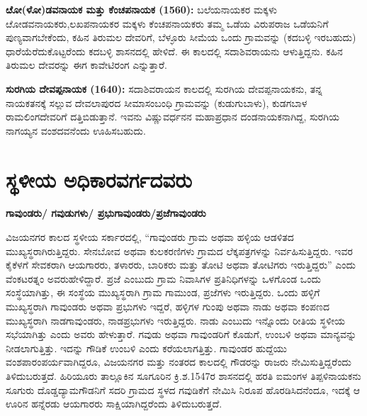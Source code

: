 \newpage

\textbf{ೞೋ(ಳೋ)ಡವನಾಯಕ ಮತ್ತು ಕೆಂಚಪನಾಯಕ (1560): }ಬಲೆಯನಾಯಕರ ಮಕ್ಕಳು ೞೋಡವನಾಯಕರು,\break ಲಖಪನಾಯಕರ ಮಕ್ಕಳು ಕೆಂಚಪನಾಯಕರು ತಮ್ಮ ಒಡೆಯ ವಿರುಪರಾಜ ಒಡೆಯನಿಗೆ ಪುಣ್ಯವಾಗಬೇಕೆಂದು, ಕಹಿನ ತಿರುಮಲ ದೇವರಿಗೆ, ಬೆಳ್ಳೂರು ಸೀಮೆಯ ಒಂದು ಗ್ರಾಮವನ್ನು (ಕದಬಳ್ಳಿ ಇರಬಹುದು) ಧಾರೆಯೆರೆದುಕೊಟ್ಟರೆಂದು ಕದಬಳ್ಳಿ ಶಾಸನದಲ್ಲಿ ಹೇಳಿದೆ. ಈ ಕಾಲದಲ್ಲಿ ಸದಾಶಿವರಾಯನು ಆಳುತ್ತಿದ್ದನು. ಕಹಿನ ತಿರುಮಲ ದೇವರನ್ನು ಈಗ ಕಾವೇಟಿರಂಗ ಎನ್ನುತ್ತಾರೆ.

\textbf{ಸುರಗಿಯ ದೇವಪ್ಪನಾಯಕ (1640):} ಸದಾಶಿವರಾಯನ ಕಾಲದಲ್ಲಿ ಸುರಗಿಯ ದೇವಪ್ಪನಾಯಕನು, ತನ್ನ ನಾಯಕ\-ತನಕ್ಕೆ ಸಲ್ಲುವ ದೇವಲಾಪುರದ ಸೀಮಾಸಂಬಂಧಿ ಗ್ರಾಮವನ್ನು (ಕುಡುಗುಬಾಳು), ಕುಡಗಬಾಳ ರಾಮಲಿಂಗದೇವರಿಗೆ ದತ್ತಿಬಿಡುತ್ತಾನೆ. ಇವನು ವಿಷ್ಣುವರ್ಧನನ ಮಹಾಪ್ರಧಾನ ದಂಡನಾಯಕನಾಗಿದ್ದ, ಸುರಗಿಯ ನಾಗಯ್ಯನ ವಂಶದವನೆಂದು ಊಹಿಸಬಹುದು.

\section{ಸ್ಥಳೀಯ ಅಧಿಕಾರವರ್ಗದವರು}

\textbf{ಗಾವುಂಡರು/ ಗವುಡುಗಳು/ ಪ್ರಭುಗಾವುಂಡರು/ಪ್ರಜೆಗಾವುಂಡರು}

ವಿಜಯನಗರ ಕಾಲದ ಸ್ಥಳೀಯ ಸರ್ಕಾರದಲ್ಲಿ, “ಗಾವುಂಡರು ಗ್ರಾಮ ಅಥವಾ ಹಳ್ಳಿಯ ಆಡಳಿತದ ಮುಖ್ಯಸ್ಥರಾಗಿರು\-ತ್ತಿದ್ದರು. ಸೇನಬೋವ ಅಥವಾ ಕುಲಕರಣಿಗಳು ಗ್ರಾಮದ ಲೆಕ್ಕಪತ್ರಗಳನ್ನು ನಿರ್ವಹಿಸುತ್ತಿದ್ದರು. ಇವರ ಕೈಕೆಳಗೆ ಸೇವಕರಾಗಿ ಆಯಗಾರರು, ತಳಾರರು, ಬಾರಿಕರು ಮತ್ತು ತೋಟಿ ಅಥವಾ ತೋಟಿಗರು ಇರುತ್ತಿದ್ದರು” ಎಂದು ವೆಂಕಟರತ್ನಂ ಅವರುಹೇಳಿದ್ದಾರೆ. ಪ್ರಜೆ ಎಂಬುದು ಗ್ರಾಮ ನಿವಾಸಿಗಳ ಪ್ರತಿನಿಧಿಗಳನ್ನು ಒಳಗೊಂಡ ಒಂದು ಸಂಸ್ಥೆಯಾಗಿತ್ತು, ಈ ಸಂಸ್ಥೆಯ ಮುಖ್ಯಸ್ಥರಾಗಿ ಗ್ರಾಮ ಗಾಮುಂಡ, ಪ್ರಜೆಗಳು ಇರುತ್ತಿದ್ದರು. ಒಂದು ಹಳ್ಳಿಗೆ ಮುಖ್ಯಸ್ಥರಾಗಿ ಗಾವುಂಡರು ಅಥವಾ ಪ್ರಭುಗಳು ಇದ್ದರೆ, ಹಳ್ಳಿಗಳ ಗುಂಪು ಅಥವಾ ನಾಡು ಅಥವಾ ಕಂಪಣದ ಮುಖ್ಯಸ್ಥರಾಗಿ ನಾಡಗಾವುಂಡರು, ನಾಡಪ್ರಭುಗಳು ಇರುತ್ತಿದ್ದರು. ನಾಡು ಎಂಬುದು ಇನ್ನೊಂದು ರೀತಿಯ ಸ್ಥಳೀಯ ಸಭೆಯಾಗಿತ್ತು ಎಂದು ಅವರು ಹೇಳುತ್ತಾರೆ. ಗವುಡು ಅಥವಾ ಗಾವುಂಡರಿಗೆ ಕೊಡುಗೆ, ಉಂಬಳಿ ಅಥವಾ ಮಾನ್ಯವನ್ನು ನೀಡಲಾಗುತ್ತಿತ್ತು. ಇದನ್ನು ಗೌಡಿಕೆ ಉಂಬಳಿ ಎಂದು ಕರೆಯಲಾಗತ್ತಿತ್ತು. ಗಾವುಂಡರ ಹುದ್ದೆಯು ವಂಶಪಾರಂಪರ್ಯವಾಗಿದ್ದರೂ, ವಿಜಯನಗರ ಮತ್ತು ನಂತರದ ಕಾಲದಲ್ಲಿ ಗೌಡರನ್ನು ರಾಜರು ನೇಮಿಸುತ್ತಿದ್ದರೆಂದು ತಿಳಿದುಬರುತ್ತದೆ. ಹಿರಿಯೂರು ತಾಲ್ಲೂಕಿನ ಸೂಗೂರಿನ ಕ್ರಿ.ಶ.1547ರ ಶಾಸನದಲ್ಲಿ ಹರತಿ ಐಮಂಗಳ ತಿಪ್ಪಳಿನಾಯಕನು ಸೂಗುರು ದೊಡ್ಡದ್ಯಾಮಗೌಡನಿಗೆ ಸದರಿ ಗ್ರಾಮದ ಸ್ಥಳದ ಗವುಡಿಕೆಗೆ ನೇಮಿಸಿ ನಿರೂಪ ಹೊರಡಿಸಿದನೆಂದೂ, ಇದಕ್ಕೆ ಆ ಊರಿನ ಹನ್ನೆರಡು ಆಯಗಾರರು ಸಾಕ್ಷಿಯಾಗಿದ್ದರೆಂದು ತಿಳಿದುಬರುತ್ತದೆ.

